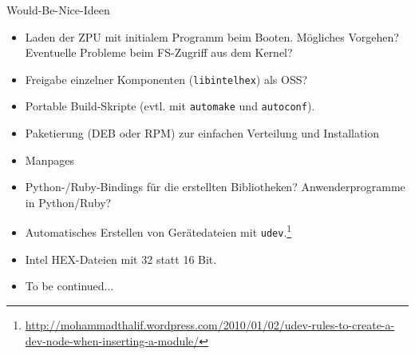 \documentclass[10pt]{beamer}
\begin{document}
	\begin{frame}{Would-Be-Nice-Ideen}
		\begin{itemize}
			\item Laden der ZPU mit initialem Programm beim Booten. Mögliches Vorgehen? Eventuelle Probleme beim FS-Zugriff aus dem Kernel?
			\item Freigabe einzelner Komponenten (\texttt{libintelhex}) als OSS?
			\item Portable Build-Skripte (evtl. mit \texttt{automake} und \texttt{autoconf}).
			\item Paketierung (DEB oder RPM) zur einfachen Verteilung und Installation
			\item Manpages
			\item Python-/Ruby-Bindings für die erstellten Bibliotheken? Anwenderprogramme in Python/Ruby?
			\item Automatisches Erstellen von Gerätedateien mit \texttt{udev}.\footnote{\url{http://mohammadthalif.wordpress.com/2010/01/02/udev-rules-to-create-a-dev-node-when-inserting-a-module/}}
			\item Intel HEX-Dateien mit 32 statt 16 Bit.
			\item To be continued...
		\end{itemize}
	\end{frame}
\end{document}
